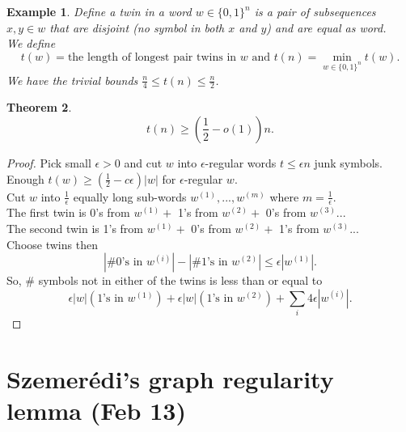 \documentclass[a4paper]{article}
\newtheorem{thm}{Theorem}[section]
\newtheorem{eg}[thm]{Example}
\begin{document}
\begin{eg}
    Define a twin in a word $w\in \{0,1\}^n$ is a pair of subsequences $x,y\in w$ that are disjoint (no symbol in both $x$ and $y$) and are equal as word. \\
    We define \[
    t(w)=\text{the length of longest pair twins in $w$} \text{ and } t(n)=\min_{w\in \{0,1\}^n} t(w)
    .\] 
    We have the trivial bounds $\frac{n}{4}\leq t(n)\leq \frac{n}{2}$.
\end{eg}
    \begin{thm}
        \[
        t(n)\geq \left( \frac{1}{2}-o(1) \right)n
        .\] 
    \end{thm}
    \begin{proof}
        Pick small $\epsilon>0$ and cut $w$ into $\epsilon$-regular words $t\leq \epsilon n$ junk symbols. Enough $t(w)\geq \left( \frac{1}{2}-c\epsilon \right)|w|$ for $\epsilon$-regular $w.$\\
        Cut $w$ into $\frac{1}{\epsilon}$ equally long sub-words $w^{(1)},...,w^{(m)}$ where $m=\frac{1}{\epsilon}$. \\
        The first twin is 0's from $w^{(1)}+$ 1's from $w^{(2)}+$ 0's from $w^{(3)}$...\\
        The second twin is 1's from $w^{(1)}+$ 0's from $w^{(2)}+$ 1's from $w^{(3)}$...\\
        Choose twins then \[
        | \text{\# 0's in }w^{(i)}|-| \text{\# 1's in }w^{(2)}|\leq \epsilon |w^{(1)}|
        .\] 
        So, \# symbols not in either of the twins is less than or equal to \[
        \epsilon|w|( \text{1's in } w^{(1)})+\epsilon|w|( \text{1's in } w^{(2)})+\sum_{i}4\epsilon |w^{(i)}|
        .\] 
    \end{proof}

\newpage
\section{Szemer\'edi's graph regularity lemma (Feb 13)}
\end{document}
